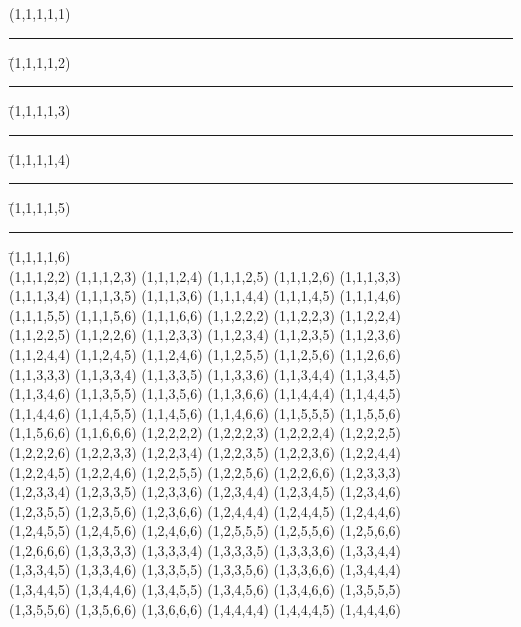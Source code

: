 \begin{tabbing}
(1,1,1,1,1) \rule{8pt}{0pt} \= (1,1,1,1,2) \rule{8pt}{0pt} \= (1,1,1,1,3) \rule{8pt}{0pt} \= (1,1,1,1,4) \rule{8pt}{0pt} \= (1,1,1,1,5) \rule{8pt}{0pt} \= (1,1,1,1,6) \\ 
(1,1,1,2,2) \> (1,1,1,2,3) \> (1,1,1,2,4) \> (1,1,1,2,5) \> (1,1,1,2,6) \> (1,1,1,3,3) \\ 
(1,1,1,3,4) \> (1,1,1,3,5) \> (1,1,1,3,6) \> (1,1,1,4,4) \> (1,1,1,4,5) \> (1,1,1,4,6) \\ 
(1,1,1,5,5) \> (1,1,1,5,6) \> (1,1,1,6,6) \> (1,1,2,2,2) \> (1,1,2,2,3) \> (1,1,2,2,4) \\ 
(1,1,2,2,5) \> (1,1,2,2,6) \> (1,1,2,3,3) \> (1,1,2,3,4) \> (1,1,2,3,5) \> (1,1,2,3,6) \\ 
(1,1,2,4,4) \> (1,1,2,4,5) \> (1,1,2,4,6) \> (1,1,2,5,5) \> (1,1,2,5,6) \> (1,1,2,6,6) \\ 
(1,1,3,3,3) \> (1,1,3,3,4) \> (1,1,3,3,5) \> (1,1,3,3,6) \> (1,1,3,4,4) \> (1,1,3,4,5) \\ 
(1,1,3,4,6) \> (1,1,3,5,5) \> (1,1,3,5,6) \> (1,1,3,6,6) \> (1,1,4,4,4) \> (1,1,4,4,5) \\ 
(1,1,4,4,6) \> (1,1,4,5,5) \> (1,1,4,5,6) \> (1,1,4,6,6) \> (1,1,5,5,5) \> (1,1,5,5,6) \\ 
(1,1,5,6,6) \> (1,1,6,6,6) \> (1,2,2,2,2) \> (1,2,2,2,3) \> (1,2,2,2,4) \> (1,2,2,2,5) \\ 
(1,2,2,2,6) \> (1,2,2,3,3) \> (1,2,2,3,4) \> (1,2,2,3,5) \> (1,2,2,3,6) \> (1,2,2,4,4) \\ 
(1,2,2,4,5) \> (1,2,2,4,6) \> (1,2,2,5,5) \> (1,2,2,5,6) \> (1,2,2,6,6) \> (1,2,3,3,3) \\ 
(1,2,3,3,4) \> (1,2,3,3,5) \> (1,2,3,3,6) \> (1,2,3,4,4) \> (1,2,3,4,5) \> (1,2,3,4,6) \\ 
(1,2,3,5,5) \> (1,2,3,5,6) \> (1,2,3,6,6) \> (1,2,4,4,4) \> (1,2,4,4,5) \> (1,2,4,4,6) \\ 
(1,2,4,5,5) \> (1,2,4,5,6) \> (1,2,4,6,6) \> (1,2,5,5,5) \> (1,2,5,5,6) \> (1,2,5,6,6) \\ 
(1,2,6,6,6) \> (1,3,3,3,3) \> (1,3,3,3,4) \> (1,3,3,3,5) \> (1,3,3,3,6) \> (1,3,3,4,4) \\ 
(1,3,3,4,5) \> (1,3,3,4,6) \> (1,3,3,5,5) \> (1,3,3,5,6) \> (1,3,3,6,6) \> (1,3,4,4,4) \\ 
(1,3,4,4,5) \> (1,3,4,4,6) \> (1,3,4,5,5) \> (1,3,4,5,6) \> (1,3,4,6,6) \> (1,3,5,5,5) \\ 
(1,3,5,5,6) \> (1,3,5,6,6) \> (1,3,6,6,6) \> (1,4,4,4,4) \> (1,4,4,4,5) \> (1,4,4,4,6) \\ 

\end{tabbing}
